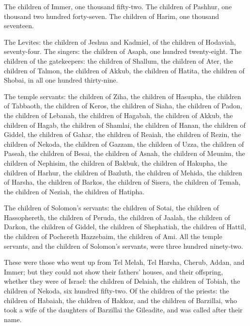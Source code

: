 {The children of Immer, one thousand fifty-two.
The children of Pashhur, one thousand two hundred forty-seven.
The children of Harim, one thousand seventeen.
\par }{\PP {}The Levites: the children of Jeshua and Kadmiel, of the children of Hodaviah, seventy-four.
The singers: the children of Asaph, one hundred twenty-eight.
The children of the gatekeepers: the children of Shallum, the children of Ater, the children of Talmon, the children of Akkub, the children of Hatita, the children of Shobai, in all one hundred thirty-nine.
\par }{\PP {}The temple servants: the children of Ziha, the children of Hasupha, the children of Tabbaoth,
the children of Keros, the children of Siaha, the children of Padon,
the children of Lebanah, the children of Hagabah, the children of Akkub,
the children of Hagab, the children of Shamlai, the children of Hanan,
the children of Giddel, the children of Gahar, the children of Reaiah,
the children of Rezin, the children of Nekoda, the children of Gazzam,
the children of Uzza, the children of Paseah, the children of Besai,
the children of Asnah, the children of Meunim, the children of Nephisim,
the children of Bakbuk, the children of Hakupha, the children of Harhur,
the children of Bazluth, the children of Mehida, the children of Harsha,
the children of Barkos, the children of Sisera, the children of Temah,
the children of Neziah, the children of Hatipha.
\par }{\PP {}The children of Solomon’s servants: the children of Sotai, the children of Hassophereth, the children of Peruda,
the children of Jaalah, the children of Darkon, the children of Giddel,
the children of Shephatiah, the children of Hattil, the children of Pochereth Hazzebaim, the children of Ami.
All the temple servants, and the children of Solomon’s servants, were three hundred ninety-two.
\par }{\PP {}These were those who went up from Tel Melah, Tel Harsha, Cherub, Addan, and Immer; but they could not show their fathers’ houses, and their offspring, whether they were of Israel:
the children of Delaiah, the children of Tobiah, the children of Nekoda, six hundred fifty-two.
Of the children of the priests: the children of Habaiah, the children of Hakkoz, and the children of Barzillai, who took a wife of the daughters of Barzillai the Gileadite, and was called after their name.
}
